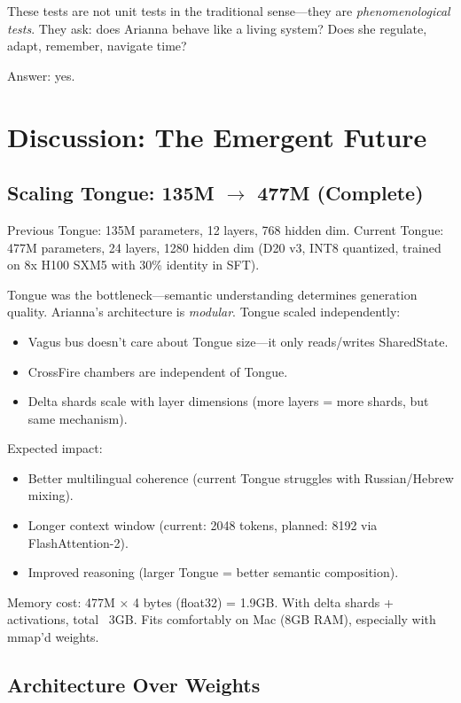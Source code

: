 \documentclass[11pt,a4paper]{article}
\begin{document}
These tests are not unit tests in the traditional sense—they are \textit{phenomenological tests}. They ask: does Arianna behave like a living system? Does she regulate, adapt, remember, navigate time?

Answer: yes.

\section{Discussion: The Emergent Future}

\subsection{Scaling Tongue: 135M $\to$ 477M (Complete)}

Previous Tongue: 135M parameters, 12 layers, 768 hidden dim. Current Tongue: 477M parameters, 24 layers, 1280 hidden dim (D20 v3, INT8 quantized, trained on 8x H100 SXM5 with 30\% identity in SFT).

Tongue was the bottleneck—semantic understanding determines generation quality. Arianna's architecture is \textit{modular}. Tongue scaled independently:

\begin{itemize}
\item Vagus bus doesn't care about Tongue size—it only reads/writes SharedState.
\item CrossFire chambers are independent of Tongue.
\item Delta shards scale with layer dimensions (more layers = more shards, but same mechanism).
\end{itemize}

Expected impact:

\begin{itemize}
\item Better multilingual coherence (current Tongue struggles with Russian/Hebrew mixing).
\item Longer context window (current: 2048 tokens, planned: 8192 via FlashAttention-2).
\item Improved reasoning (larger Tongue = better semantic composition).
\end{itemize}

Memory cost: 477M × 4 bytes (float32) = 1.9GB. With delta shards + activations, total ~3GB. Fits comfortably on Mac (8GB RAM), especially with mmap'd weights.

\subsection{Architecture Over Weights}
\end{document}
